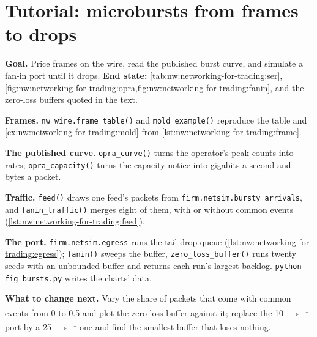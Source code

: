 \section{Tutorial: microbursts from frames to drops}\label{tut:nw:networking-for-trading:tut}

\begin{tutorial}
\textbf{Goal.} Price frames on the wire, read the published burst curve, and simulate a fan-in port until it drops.
\textbf{End state:} \cref{tab:nw:networking-for-trading:ser}, \cref{fig:nw:networking-for-trading:opra,fig:nw:networking-for-trading:fanin},
and the zero-loss buffers quoted in the text.
\begin{tutsteps}
\item \textbf{Frames.} \texttt{nw\_wire.frame\_table()} and \texttt{mold\_example()} reproduce the table and
  \cref{ex:nw:networking-for-trading:mold} from \cref{lst:nw:networking-for-trading:frame}.
\item \textbf{The published curve.} \texttt{opra\_curve()} turns the operator's peak counts into rates; \texttt{opra\_capacity()}
  turns the capacity notice into gigabits a second and bytes a packet.
\item \textbf{Traffic.} \texttt{feed()} draws one feed's packets from \texttt{firm.netsim.bursty\_arrivals}, and
  \texttt{fanin\_traffic()} merges eight of them, with or without common events (\cref{lst:nw:networking-for-trading:feed}).
\item \textbf{The port.} \texttt{firm.netsim.egress} runs the tail-drop queue (\cref{lst:nw:networking-for-trading:egress});
  \texttt{fanin()} sweeps the buffer, \texttt{zero\_loss\_buffer()} runs twenty seeds with an unbounded buffer and returns each
  run's largest backlog. \texttt{python fig\_bursts.py} writes the charts' data.
\end{tutsteps}
\textbf{What to change next.} Vary the share of packets that come with common events from 0 to 0.5 and plot the zero-loss
buffer against it; replace the \qty{10}{\giga\bit\per\second} port by a \qty{25}{\giga\bit\per\second} one and find the smallest
buffer that loses nothing.
\end{tutorial}

\label{lst:nw:networking-for-trading:feed}

\label{lst:nw:networking-for-trading:egress}


